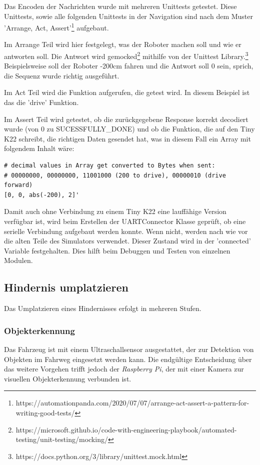 Das Encoden der Nachrichten wurde mit mehreren Unittests getestet. Diese Unittests, sowie alle folgenden Unittests in der Navigation sind nach dem Muster 'Arrange, Act, Assert'\footnote{https://automationpanda.com/2020/07/07/arrange-act-assert-a-pattern-for-writing-good-tests/} aufgebaut.

Im Arrange Teil wird hier festgelegt, was der Roboter machen soll und wie er antworten soll. Die Antwort wird gemocked\footnote{https://microsoft.github.io/code-with-engineering-playbook/automated-testing/unit-testing/mocking/} mithilfe von der Unittest Library.\footnote{https://docs.python.org/3/library/unittest.mock.html} Beispielsweise soll der Roboter -200cm fahren und die Antwort soll 0 sein, sprich, die Sequenz wurde richtig ausgeführt.

Im Act Teil wird die Funktion aufgerufen, die getest wird. In diesem Beispiel ist das die 'drive' Funktion.

Im Assert Teil wird getestet, ob die zurückgegebene Response korrekt decodiert wurde (von 0 zu SUCESSFULLY\_DONE) und ob die Funktion, die auf den Tiny K22 schreibt, die richtigen Daten gesendet hat, was in diesem Fall ein Array mit folgendem Inhalt wäre:

\begin{verbatim}
# decimal values in Array get converted to Bytes when sent:
# 00000000, 00000000, 11001000 (200 to drive), 00000010 (drive forward)
[0, 0, abs(-200), 2]'
\end{verbatim}

Damit auch ohne Verbindung zu einem Tiny K22 eine lauffähige Version verfügbar ist, wird beim Erstellen der UARTConnector Klasse geprüft, ob eine serielle Verbindung aufgebaut werden konnte. Wenn nicht, werden nach wie vor die alten Teile des Simulators verwendet. Dieser Zustand wird in der 'connected' Variable festgehalten. Dies hilft beim Debuggen und Testen von einzelnen Modulen.


\newpage
\subsection{Hindernis umplatzieren}

Das Umplatzieren eines Hindernisses erfolgt in mehreren Stufen.

\subsubsection{Objekterkennung}
Das Fahrzeug ist mit einem Ultraschallsensor ausgestattet, der zur Detektion von Objekten im Fahrweg eingesetzt werden kann. Die endgültige Entscheidung über das weitere Vorgehen trifft jedoch der \textit{Raspberry Pi}, der mit einer Kamera zur visuellen Objekterkennung verbunden ist.

